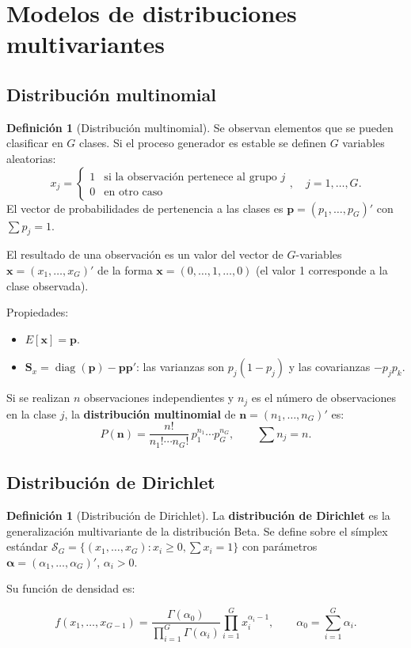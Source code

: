 \documentclass[12pt, a4paper]{article}
\theoremstyle{plain}
\theoremstyle{definition}
\newtheorem{definicion}[teorema]{Definición}
\theoremstyle{remark}
\newcommand{\mat}[1]{\mathbf{#1}}
\begin{document}
\section{Modelos de distribuciones multivariantes}

\subsection{Distribución multinomial}

\begin{definicion}[Distribución multinomial]
Se observan elementos que se pueden clasificar en $G$ clases. Si el proceso
generador es estable se definen $G$ variables aleatorias:
\[
  x_j = \begin{cases}1 & \text{si la observación pertenece al grupo }j\\
                     0 & \text{en otro caso}\end{cases}, \quad j=1,\dots,G.
\]
El vector de probabilidades de pertenencia a las clases es
$\mathbf{p}=(p_1,\dots,p_G)'$ con $\sum p_j=1$.

El resultado de una observación es un valor del vector de $G$-variables
$\mathbf{x}=(x_1,\dots,x_G)'$ de la forma $\mathbf{x}=(0,\dots,1,\dots,0)$
(el valor 1 corresponde a la clase observada).
\end{definicion}

Propiedades:
\begin{itemize}
  \item $E[\mathbf{x}] = \mathbf{p}$.
  \item $\mat{S}_x = \operatorname{diag}(\mathbf{p}) - \mathbf{p}\mathbf{p}'$:
        las varianzas son $p_j(1-p_j)$ y las covarianzas $-p_jp_k$.
\end{itemize}

Si se realizan $n$ observaciones independientes y $n_j$ es el número de
observaciones en la clase $j$, la \textbf{distribución multinomial} de
$\mathbf{n}=(n_1,\dots,n_G)'$ es:
\[
  P(\mathbf{n}) = \frac{n!}{n_1!\cdots n_G!}\,p_1^{n_1}\cdots p_G^{n_G},
  \qquad \sum n_j=n.
\]

\subsection{Distribución de Dirichlet}

\begin{definicion}[Distribución de Dirichlet]
La \textbf{distribución de Dirichlet} es la generalización multivariante de
la distribución Beta. Se define sobre el símplex estándar
$\mathcal{S}_G = \{(x_1,\dots,x_G): x_i\ge0, \sum x_i=1\}$ con parámetros
$\boldsymbol{\alpha}=(\alpha_1,\dots,\alpha_G)'$, $\alpha_i>0$.

Su función de densidad es:
\begin{mdframed}[style=resultado]
\[
  f(x_1,\dots,x_{G-1}) = \frac{\Gamma(\alpha_0)}{\prod_{i=1}^G\Gamma(\alpha_i)}
  \prod_{i=1}^G x_i^{\alpha_i-1},
  \qquad \alpha_0 = \sum_{i=1}^G\alpha_i.
\]
\end{mdframed}
\end{definicion}
\end{document}

